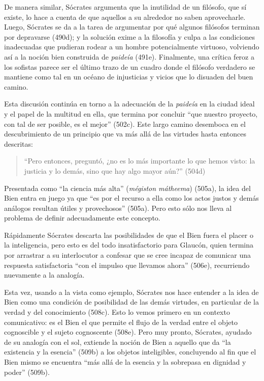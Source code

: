 De manera similar, Sócrates argumenta que la
inutilidad de un filósofo, que sí existe, lo
hace a cuenta de que aquellos a su alrededor
no saben aprovecharle. Luego, Sócrates se da
a la tarea de argumentar por qué algunos
filósofos terminan por depravarse (490d); y
la solución exime a la filosofía y culpa a
las condiciones inadecuadas que pudieran
rodear a un hombre potencialmente virtuoso,
volviendo así a la noción bien construida de
\emph{paideía} (491e). Finalmente, una
crítica feroz a los sofistas parece ser el
último trazo de un cuadro donde el filósofo
verdadero se mantiene como tal en un océano
de injusticias y vicios que lo disuaden del
buen camino.

Esta discusión continúa en torno a la
adecuación de la \emph{paideía} en la ciudad
ideal y el papel de la multitud en ella, que
termina por concluir ``que nuestro proyecto,
con tal de ser posible, es el mejor'' (502c).
Este largo camino desemboca en el
descubrimiento de un principio que va más
allá de las virtudes hasta entonces
descritas:

\begin{quote}
``Pero entonces, preguntó, ¿no es lo más
importante lo que hemos visto: la justicia y
lo demás, sino que hay algo mayor aún?''
(504d)
\end{quote}

Presentada como ``la ciencia más alta''
(\emph{mégiston mátheema}) (505a), la idea
del Bien entra en juego ya que ``es por el
recurso a ella como los actos justos y demás
análogos resultan útiles y provechosos''
(505a). Pero esto sólo nos lleva al problema
de definir adecuadamente este concepto.

Rápidamente Sócrates descarta las
posibilidades de que el Bien fuera el placer
o la inteligencia, pero esto es del todo
insatisfactorio para Glaucón, quien termina
por arrastrar a su interlocutor a confesar
que se cree incapaz de comunicar una
respuesta satisfactoria ``con el impulso que
llevamos ahora'' (506e), recurriendo
nuevamente a la analogía.

Esta vez, usando a la vista como ejemplo,
Sócrates nos hace entender a la idea de Bien
como una condición de posibilidad de las
demás virtudes, en particular de la verdad y
del conocimiento (508c). Esto lo vemos
primero en un contexto comunicativo: es el
Bien el que permite el flujo de la verdad
entre el objeto cognoscible y el sujeto
cognoscente (508e). Pero muy pronto,
Sócrates, ayudado de su analogía con el sol,
extiende la noción de Bien a aquello que da
``la existencia y la esencia'' (509b) a los
objetos inteligibles, concluyendo al fin que
el Bien mismo se encuentra ``más allá de la
esencia y la sobrepasa en dignidad y poder''
(509b).


